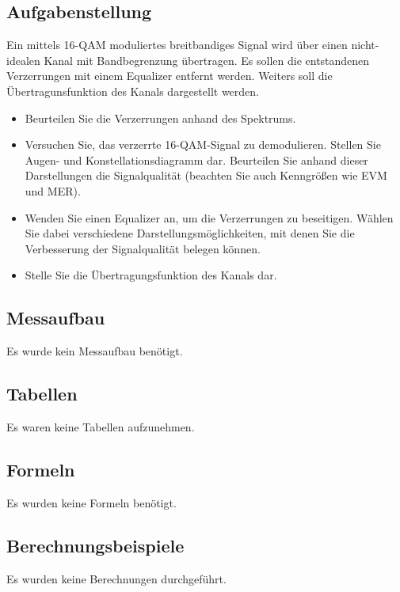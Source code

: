 \documentclass[12pt,a4paper,ngerman]{article}
\begin{document}
\subsection{Aufgabenstellung}
Ein mittels 16-QAM moduliertes breitbandiges Signal wird über einen nicht-idealen Kanal mit Bandbegrenzung übertragen. Es sollen die entstandenen Verzerrungen mit einem Equalizer entfernt werden. Weiters soll die Übertragunsfunktion des Kanals dargestellt werden. 
\begin{itemize}
\item Beurteilen Sie die Verzerrungen anhand des Spektrums.
\item Versuchen Sie, das verzerrte 16-QAM-Signal zu demodulieren. Stellen Sie Augen- und Konstellationsdiagramm dar. Beurteilen Sie anhand dieser Darstellungen die Signalqualität (beachten Sie auch Kenngrößen wie EVM und MER).
\item Wenden Sie einen Equalizer an, um die Verzerrungen zu beseitigen. Wählen Sie dabei verschiedene Darstellungsmöglichkeiten, mit denen Sie die Verbesserung der Signalqualität belegen können. 
\item Stelle Sie die Übertragungsfunktion des Kanals dar. 
\end{itemize}
\cite[18]{skript}

\subsection{Messaufbau}
Es wurde kein Messaufbau benötigt.
\subsection{Tabellen}
Es waren keine Tabellen aufzunehmen. 
\subsection{Formeln}
Es wurden keine Formeln benötigt.
\subsection{Berechnungsbeispiele}
Es wurden keine Berechnungen durchgeführt.

\pagebreak
\end{document}
